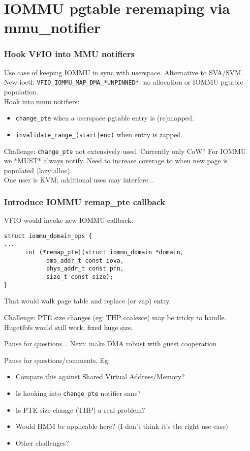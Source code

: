 \documentclass{beamer}
\begin{document}
\section{IOMMU pgtable reremaping via mmu\_notifier}
\begin{frame}[fragile]
  \frametitle{Hook VFIO into MMU notifiers}
  Use case of keeping IOMMU in sync with userspace. Alternative to SVA/SVM.\\
  
  New ioctl: \texttt{VFIO\_IOMMU\_MAP\_DMA\_*UNPINNED*}: no allocation or IOMMU pgtable population.\\

  Hook into mmu notifiers:
  \begin{itemize}
    \item \texttt{change\_pte} when a userspace pgtable entry is (re)mapped.
    \item \texttt{invalidate\_range\_(start|end)} when entry is zapped.
  \end{itemize}

  Challenge: \texttt{change\_pte} not extensively used. Currently only CoW? For IOMMU we *MUST* always notify. Need to increase coverage to when new page is populated (lazy alloc).\\
  
  One user is KVM; additional uses may interfere...
\end{frame}

\begin{frame}[fragile]
  \frametitle{Introduce IOMMU remap\_pte callback}
  VFIO would invoke new IOMMU callback:
  \begin{verbatim}
struct iommu_domain_ops {
...
      int (*remap_pte)(struct iommu_domain *domain,
			dma_addr_t const iova,
			phys_addr_t const pfn,
			size_t const size);
}
  \end{verbatim}
  That would walk page table and replace (or zap) entry.

  Challenge: PTE size changes (eg: THP coalesce) may be tricky to handle. Hugetlbfs would still work; fixed huge size.
\end{frame}

\begin{frame}{Pause for questions...}
  Next: make DMA robust with guest cooperation

  Pause for questions/comments. Eg:
  \begin{itemize}
    \item Compare this against Shared Virtual Address/Memory?
    \item Is hooking into \texttt{change\_pte} notifier sane?
    \item Is PTE size change (THP) a real problem?
    \item Would HMM be applicable here? (I don't think it's the right use case)
    \item Other challenges?
  \end{itemize}
\end{frame}
\end{document}
